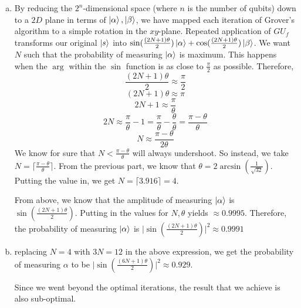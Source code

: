 \documentclass{article}
\begin{document}
\begin{enumerate}[(a)]
    A single iteration of Grover's algorithm involves applying the Oracle, followed by the Diffusion. That is, any input qubit goes through the transformation of $\ket{\psi} \longrightarrow U_f\ket{\psi} \longrightarrow GU_f\ket{\psi}$. In our case,
    \[
    GU_f = \frac{1}{16} \begin{bmatrix}
        -15 &   \sqrt{31}   \\
        \sqrt{31}   &   15
    \end{bmatrix} \begin{bmatrix}
        -1  &   0   \\
        0   &   1
    \end{bmatrix} = \frac{1}{16} \begin{bmatrix}
        15  &   \sqrt{31}   \\
        -\sqrt{31}  &   15
    \end{bmatrix}
    \]

    Applying $GU_f$ to our qubit $\ket{s}$, we get $\frac{23\sqrt{2}}{64}\ket{\alpha} + \frac{7\sqrt{62}}{64}\ket{\beta}$.

    Therefore, the probability of measuring $\ket{\alpha}$ is $\vert\frac{23\sqrt{2}}{64}\vert^2 \approx 25.83\%$

    \item
    By reducing the $2^n$-dimensional space (where $n$ is the number of qubits) down to a $2D$ plane in terms of $\ket{\alpha}, \ket{\beta}$, we have mapped each iteration of Grover's algorithm to a simple rotation in the $xy$-plane. Repeated application of $GU_f$ transforms our original $\ket{s}$ into $\sin(\frac{(2N+1)\theta}{2})\ket{\alpha} + \cos(\frac{(2N+1)\theta}{2})\ket{\beta}$. We want $N$ such that the probability of measuring $\ket{\alpha}$ is maximum. This happens when the $\arg$ within the $\sin$ function is as close to $\frac{\pi}{2}$ as possible. Therefore,
    \[
    \frac{(2N+1)\theta}{2} \approx \frac{\pi}{2}
    \]
    \[
    (2N+1)\theta \approx \pi
    \]
    \[
    2N+1 \approx \frac{\pi}{\theta}
    \]
    \[
    2N \approx \frac{\pi}{\theta} - 1 = \frac{\pi}{\theta} - \frac{\theta}{\theta} = \frac{\pi-\theta}{\theta}
    \]
    \[N \approx \frac{\pi-\theta}{2\theta}\]
    We know for sure that $N < \frac{\pi-\theta}{\theta}$ will always undershoot. So instead, we take $N = \lceil\frac{\pi-\theta}{\theta}\rceil$. From the previous part, we know that $\theta = 2\arcsin(\frac{1}{\sqrt{32}})$. Putting the value in, we get $N = \lceil{3.916}\rceil = 4$.

    From above, we know that the amplitude of measuring $\ket{\alpha}$ is $\sin(\frac{(2N+1)\theta}{2})$. Putting in the values for $N, \theta$ yields $\approx 0.9995$. Therefore, the probability of measuring $\ket{\alpha}$ is $\vert\sin(\frac{(2N+1)\theta}{2})\vert^2 \approx 0.9991$

    \item
    replacing $N = 4$ with $3N = 12$ in the above expression, we get the probability of measuring $\alpha$ to be $\vert\sin(\frac{(6N+1)\theta}{2})\vert^2 \approx 0.929$.

    Since we went beyond the optimal iterations, the result that we achieve is also sub-optimal.
\end{enumerate}
\end{document}
